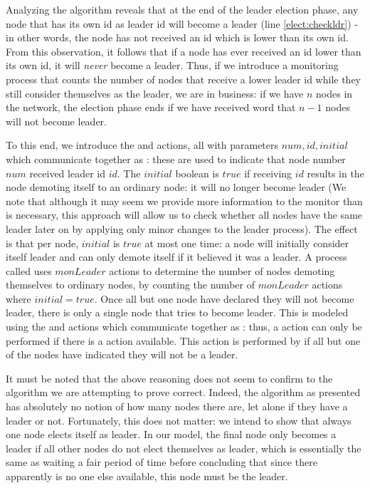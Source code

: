 Analyzing the algorithm reveals that at the end of the leader election phase, any node that has its own id as leader id will become a leader (line \ref{elect:checkldr}) - in other words, the node has not received an id which is lower than its own id. From this observation, it follows that if a node has ever received an id lower than its own id, it will \emph{never} become a leader. Thus, if we introduce a monitoring process that counts the number of nodes that receive a lower leader id while they still consider themselves as the leader, we are in business: if we have $n$ nodes in the network, the election phase ends if we have received word that $n-1$ nodes will not become leader.

To this end, we introduce the  and  actions, all with parameters $num,id,initial$ which communicate together as : these are used to indicate that node number $num$ received leader id $id$. The $initial$ boolean is $true$ if receiving $id$ results in the node demoting itself to an ordinary node: it will no longer become leader (We note that although it may seem we provide more information to the monitor than is necessary, this approach will allow us to check whether all nodes have the same leader later on by applying only minor changes to the leader process). The effect is that per node, $initial$ is $true$ at most one time: a node will initially consider itself leader and can only demote itself if it believed it was a leader. A process called  uses $monLeader$ actions to determine the number of nodes demoting themselves to ordinary nodes, by counting the number of $monLeader$ actions where $initial = true$. Once all but one node have declared they will not become leader, there is only a single node that tries to become leader. This is modeled using the  and  actions which communicate together as : thus, a  action can only be performed if there is a  action available. This action is performed by  if all but one of the nodes have indicated they will not be a leader.

It must be noted that the above reasoning does not seem to confirm to the algorithm we are attempting to prove correct. Indeed, the algorithm as presented has absolutely no notion of how many nodes there are, let alone if they have a leader or not. Fortunately, this does not matter: we intend to show that always one node elects itself as leader. In our model, the final node only becomes a leader if all other nodes do not elect themselves as leader, which is essentially the same as waiting a fair period of time before concluding that since there apparently is no one else available, this node must be the leader.

